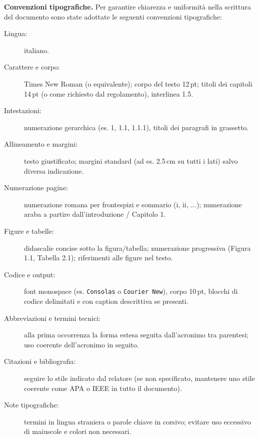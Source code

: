 \vspace{6pt}
\noindent\textbf{Convenzioni tipografiche.} Per garantire chiarezza e uniformità nella scrittura del documento sono state adottate le seguenti convenzioni tipografiche:
\begin{description}
  \item[Lingua:] italiano.
  \item[Carattere e corpo:] Times New Roman (o equivalente); corpo del testo 12\,pt; titoli dei capitoli 14\,pt (o come richiesto dal regolamento), interlinea 1.5.
  \item[Intestazioni:] numerazione gerarchica (es. 1, 1.1, 1.1.1), titoli dei paragrafi in grassetto.
  \item[Allineamento e margini:] testo giustificato; margini standard (ad es. 2.5\,cm su tutti i lati) salvo diversa indicazione.
  \item[Numerazione pagine:] numerazione romana per frontespizi e sommario (i, ii, ...); numerazione araba a partire dall'introduzione / Capitolo 1.
  \item[Figure e tabelle:] didascalie concise sotto la figura/tabella; numerazione progressiva (Figura 1.1, Tabella 2.1); riferimenti alle figure nel testo.
  \item[Codice e output:] font monospace (es. \texttt{Consolas} o \texttt{Courier New}), corpo 10\,pt, blocchi di codice delimitati e con caption descrittiva se presenti.
  \item[Abbreviazioni e termini tecnici:] alla prima occorrenza la forma estesa seguita dall'acronimo tra parentesi; uso coerente dell'acronimo in seguito.
  \item[Citazioni e bibliografia:] seguire lo stile indicato dal relatore (se non specificato, mantenere uno stile coerente come APA o IEEE in tutto il documento).
  \item[Note tipografiche:] termini in lingua straniera o parole chiave in corsivo; evitare uso eccessivo di maiuscole e colori non necessari.
\end{description}
\endgroup

\vfill
